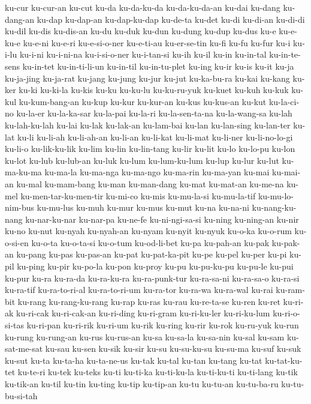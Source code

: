 {ku-cur ku-cur-an ku-cut ku-da ku-da-ku-da ku-da-ku-da-an ku-dai ku-dang
ku-dang-an ku-dap ku-dap-an ku-dap-ku-dap ku-de-ta ku-det ku-di ku-di-an
ku-di-di ku-dil ku-dis ku-dis-an ku-du ku-duk ku-dun ku-dung ku-dup ku-dus
ku-e ku-e-ku-e ku-e-ni ku-e-ri ku-e-si-o-ner ku-e-ti-au ku-er-se-tin ku-fi
ku-fu ku-fur ku-i ku-i-lu ku-i-ni ku-i-ni-na ku-i-si-o-ner ku-i-tan-si
ku-ih ku-il ku-in ku-in-tal ku-in-te-sens ku-in-tet ku-in-ti-li-un
ku-in-til ku-in-tu-plet ku-ing ku-ir ku-is ku-it ku-ja ku-ja-jing
ku-ja-rat ku-jang ku-jung ku-jur ku-jut ku-ka-bu-ra ku-kai ku-kang ku-ker
ku-ki ku-ki-la ku-kis ku-ku ku-ku-lu ku-ku-ru-yuk ku-kuet ku-kuh ku-kuk
ku-kul ku-kum-bang-an ku-kup ku-kur ku-kur-an ku-kus ku-kus-an ku-kut
ku-la-ci-no ku-la-er ku-la-ka-sar ku-la-pai ku-la-ri ku-la-sen-ta-na
ku-la-wang-sa ku-lah ku-lah-ku-lah ku-lai ku-lak ku-lak-an ku-lam-bai
ku-lan ku-lan-sing ku-lan-ter ku-lat ku-li ku-li-ah ku-li-ah-an ku-li-an
ku-li-kat ku-li-mat ku-li-ner ku-li-no-lo-gi ku-li-o ku-lik-ku-lik ku-lim
ku-lin ku-lin-tang ku-lir ku-lit ku-lo ku-lo-pu ku-lon ku-lot ku-lub
ku-lub-an ku-luk ku-lum ku-lum-ku-lum ku-lup ku-lur ku-lut ku-ma-ku-ma
ku-ma-la ku-ma-nga ku-ma-ngo ku-ma-rin ku-ma-yan ku-mai ku-mai-an ku-mal
ku-mam-bang ku-man ku-man-dang ku-mat ku-mat-an ku-me-na ku-mel
ku-men-tar-ku-men-tir ku-mi-co ku-mis ku-mu-la-si ku-mu-la-tif
ku-mu-lo-nim-bus ku-mu-lus ku-muh ku-mur ku-mus ku-mut ku-na ku-na-ni
ku-nang-ku-nang ku-nar-ku-nar ku-nar-pa ku-ne-fe ku-ni-ngi-sa-si ku-ning
ku-ning-an ku-nir ku-no ku-nut ku-nyah ku-nyah-an ku-nyam ku-nyit ku-nyuk
ku-o-ka ku-o-rum ku-o-si-en ku-o-ta ku-o-ta-si ku-o-tum ku-od-li-bet ku-pa
ku-pah-an ku-pak ku-pak-an ku-pang ku-pas ku-pas-an ku-pat ku-pat-ka-pit
ku-pe ku-pel ku-per ku-pi ku-pil ku-ping ku-pir ku-po-la ku-pon ku-proy
ku-pu ku-pu-ku-pu ku-pu-le ku-pui ku-pur ku-ra ku-ra-da ku-ra-ku-ra
ku-ra-punk-tur ku-ra-sa-ni ku-ra-sa-o ku-ra-si ku-ra-tif ku-ra-to-ri-al
ku-ra-to-ri-um ku-ra-tor ku-ra-wa ku-ra-wal ku-rai ku-ram-bit ku-rang
ku-rang-ku-rang ku-rap ku-ras ku-rau ku-re-ta-se ku-ren ku-ret ku-ri-ak
ku-ri-cak ku-ri-cak-an ku-ri-ding ku-ri-gram ku-ri-ku-ler ku-ri-ku-lum
ku-ri-o-si-tas ku-ri-pan ku-ri-rik ku-ri-um ku-rik ku-ring ku-rir ku-rok
ku-ru-yuk ku-run ku-rung ku-rung-an ku-rus ku-rus-an ku-sa ku-sa-la
ku-sa-nin ku-sal ku-sam ku-sat-me-sat ku-sau ku-sen ku-sik ku-sir ku-su
ku-su-ku-su ku-su-ma ku-suf ku-suk ku-sut ku-ta ku-ta-ha ku-ta-ne-us
ku-tak ku-tal ku-tan ku-tang ku-tat ku-tat-ku-tet ku-te-ri ku-tek ku-teks
ku-ti ku-ti-ka ku-ti-ku-la ku-ti-ku-ti ku-ti-lang ku-tik ku-tik-an ku-til
ku-tin ku-ting ku-tip ku-tip-an ku-tu ku-tu-an ku-tu-ba-ru ku-tu-bu-si-tah
}
